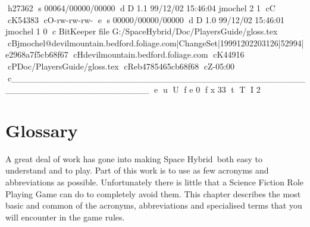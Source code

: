 h27362
s 00064/00000/00000
d D 1.1 99/12/02 15:46:04 jmochel 2 1
cC
cK54383
cO-rw-rw-rw-
e
s 00000/00000/00000
d D 1.0 99/12/02 15:46:01 jmochel 1 0
c BitKeeper file G:/SpaceHybrid/Doc/PlayersGuide/gloss.tex
cBjmochel@devilmountain.bedford.foliage.com|ChangeSet|19991202203126|52994|e2968a7f5cb68f67
cHdevilmountain.bedford.foliage.com
cK44916
cPDoc/PlayersGuide/gloss.tex
cReb4785465cb68f68
cZ-05:00
c______________________________________________________________________
e
u
U
f e 0
f x 33
t
T
I 2
\chapter{Glossary}

A great deal of work has gone into making Space Hybrid\ both
easy to understand and to play. Part of this work is to use as few 
acronyms and abbreviations as possible. Unfortunately there is little
that a Science Fiction Role Playing Game can do to completely avoid 
them. This chapter describes the most basic 
and common of the acronyms, abbreviations and specialised 
terms that you will encounter in the game rules. 

